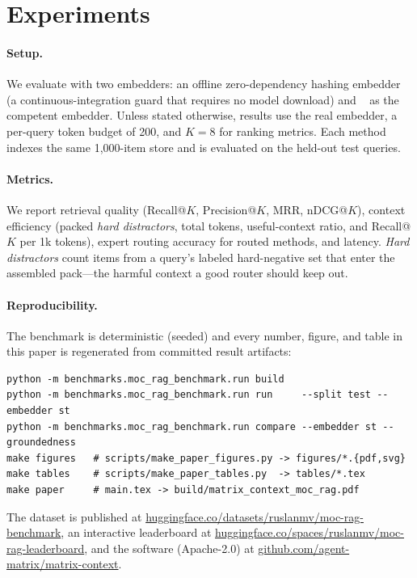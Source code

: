 \section{Experiments}
\label{sec:experiments}

\paragraph{Setup.} We evaluate with two embedders: an offline zero-dependency
hashing embedder (a continuous-integration guard that requires no model
download) and ~\cite{reimers2019sbert}
as the competent embedder. Unless stated otherwise, results use the real
embedder, a per-query token budget of 200, and $K=8$ for ranking metrics. Each
method indexes the same 1{,}000-item store and is evaluated on the held-out test
queries.

\paragraph{Metrics.} We report retrieval quality (Recall@$K$, Precision@$K$,
MRR, nDCG@$K$), context efficiency (packed \emph{hard distractors}, total tokens,
useful-context ratio, and Recall@$K$ per 1k tokens), expert routing accuracy for
routed methods, and latency. \emph{Hard distractors} count items from a query's
labeled hard-negative set that enter the assembled pack---the harmful context a
good router should keep out.

\paragraph{Reproducibility.} The benchmark is deterministic (seeded) and every
number, figure, and table in this paper is regenerated from committed result
artifacts:
{\small
\begin{verbatim}
python -m benchmarks.moc_rag_benchmark.run build
python -m benchmarks.moc_rag_benchmark.run run     --split test --embedder st
python -m benchmarks.moc_rag_benchmark.run compare --embedder st --groundedness
make figures   # scripts/make_paper_figures.py -> figures/*.{pdf,svg}
make tables    # scripts/make_paper_tables.py  -> tables/*.tex
make paper     # main.tex -> build/matrix_context_moc_rag.pdf
\end{verbatim}
}
The dataset is published at
\href{https://huggingface.co/datasets/ruslanmv/moc-rag-benchmark}{huggingface.co/datasets/ruslanmv/moc-rag-benchmark},
an interactive leaderboard at
\href{https://huggingface.co/spaces/ruslanmv/moc-rag-leaderboard}{huggingface.co/spaces/ruslanmv/moc-rag-leaderboard},
and the software (Apache-2.0) at
\href{https://github.com/agent-matrix/matrix-context}{github.com/agent-matrix/matrix-context}.
